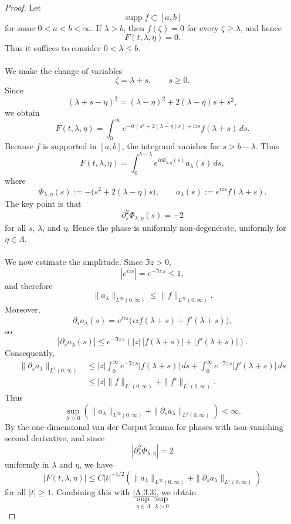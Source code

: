 \documentclass[10pt]{article}
\numberwithin{equation}{section}
\numberwithin{theorem}{section}
\begin{document}
\begin{appendix}
\begin{proof}
Let
\[
\operatorname{supp}f\subset [a,b]
\]
for some \(0<a<b<\infty\). If \(\lambda>b\), then \(f(\zeta)=0\) for every
\(\zeta\ge\lambda\), and hence
\[
F(t,\lambda,\eta)=0.
\]
Thus it suffices to consider \(0<\lambda\le b\).\\\\
We make the change of variables
\[
\zeta=\lambda+s,\qquad s\ge0.
\]
Since
\[
(\lambda+s-\eta)^2
=
(\lambda-\eta)^2+2(\lambda-\eta)s+s^2,
\]
we obtain
\[
F(t,\lambda,\eta)
=
\int_0^\infty
e^{-it(s^2+2(\lambda-\eta)s)+izs}
f(\lambda+s)\,ds .
\]
Because \(f\) is supported in \([a,b]\), the integrand vanishes for \(s>b-\lambda\).
Thus
\[
F(t,\lambda,\eta)
=
\int_0^{b-\lambda}
e^{it\Phi_{\lambda,\eta}(s)}a_\lambda(s)\,ds,
\]
where
\[
\Phi_{\lambda,\eta}(s)
:=
-\bigl(s^2+2(\lambda-\eta)s\bigr),
\qquad
a_\lambda(s):=e^{izs}f(\lambda+s).
\]
The key point is that
\[
\partial_s^2\Phi_{\lambda,\eta}(s)=-2
\]
for all \(s\), \(\lambda\), and \(\eta\). Hence the phase is uniformly non-degenerate,
uniformly for \(\eta\in\Lambda\).\\\\
We now estimate the amplitude. Since \(\Im z>0\),
\[
|e^{izs}|=e^{-\Im z\,s}\le1,
\]
and therefore
\[
\|a_\lambda\|_{L^\infty(0,\infty)}
\le
\|f\|_{L^\infty(0,\infty)} .
\]
Moreover,
\[
\partial_s a_\lambda(s)
=
e^{izs}\bigl(iz f(\lambda+s)+f'(\lambda+s)\bigr),
\]
so
\[
|\partial_s a_\lambda(s)|
\le
e^{-\Im z\,s}
\left(
|z|\,|f(\lambda+s)|+|f'(\lambda+s)|
\right).
\]
Consequently,
\[
\begin{aligned}
\|\partial_s a_\lambda\|_{L^1(0,\infty)}
&\le
|z|\int_0^\infty e^{-\Im z\,s}|f(\lambda+s)|\,ds
+
\int_0^\infty e^{-\Im z\,s}|f'(\lambda+s)|\,ds  \\
&\le
|z|\|f\|_{L^1(0,\infty)}
+
\|f'\|_{L^1(0,\infty)} .
\end{aligned}
\]
Thus
\begin{equation}
\label{A.3.3}
\sup_{\lambda>0}
\left(
\|a_\lambda\|_{L^\infty(0,\infty)}
+
\|\partial_s a_\lambda\|_{L^1(0,\infty)}
\right)
<\infty .
\end{equation}
By the one-dimensional van der Corput lemma for phases with non-vanishing second
derivative, and since
\[
|\partial_s^2\Phi_{\lambda,\eta}|=2
\]
uniformly in \(\lambda\) and \(\eta\), we have
\[
|F(t,\lambda,\eta)|
\le
C|t|^{-1/2}
\left(
\|a_\lambda\|_{L^\infty(0,\infty)}
+
\|\partial_s a_\lambda\|_{L^1(0,\infty)}
\right)
\]
for all \(|t|\ge1\). Combining this with \eqref{A.3.3}, we obtain
\[
\sup_{\eta\in\Lambda}\sup_{\lambda>0}
\]
\end{proof}
\end{appendix}
\end{document}
